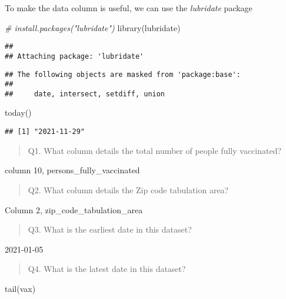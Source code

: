 \documentclass[
]{article}
\newenvironment{Shaded}{\begin{snugshade}}{\end{snugshade}}
\newcommand{\CommentTok}[1]{\textcolor[rgb]{0.56,0.35,0.01}{\textit{#1}}}
\newcommand{\FunctionTok}[1]{\textcolor[rgb]{0.00,0.00,0.00}{#1}}
\newcommand{\NormalTok}[1]{#1}
\begin{document}
To make the data column is useful, we can use the \emph{lubridate}
package

\begin{Shaded}
\begin{Highlighting}[]
\CommentTok{\# install.packages("lubridate")}
\FunctionTok{library}\NormalTok{(lubridate)}
\end{Highlighting}
\end{Shaded}

\begin{verbatim}
## 
## Attaching package: 'lubridate'
\end{verbatim}

\begin{verbatim}
## The following objects are masked from 'package:base':
## 
##     date, intersect, setdiff, union
\end{verbatim}

\begin{Shaded}
\begin{Highlighting}[]
\FunctionTok{today}\NormalTok{()}
\end{Highlighting}
\end{Shaded}

\begin{verbatim}
## [1] "2021-11-29"
\end{verbatim}

\begin{quote}
Q1. What column details the total number of people fully vaccinated?
\end{quote}

column 10, persons\_fully\_vaccinated

\begin{quote}
Q2. What column details the Zip code tabulation area?
\end{quote}

Column 2, zip\_code\_tabulation\_area

\begin{quote}
Q3. What is the earliest date in this dataset?
\end{quote}

2021-01-05

\begin{quote}
Q4. What is the latest date in this dataset?
\end{quote}

\begin{Shaded}
\begin{Highlighting}[]
\FunctionTok{tail}\NormalTok{(vax)}
\end{Highlighting}
\end{Shaded}
\end{document}
